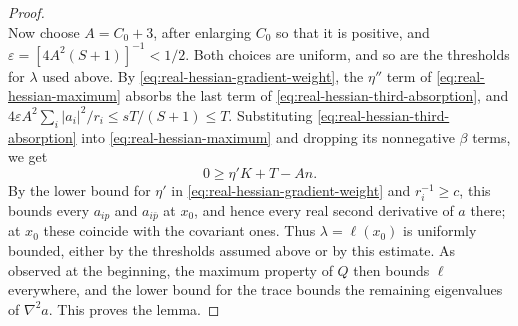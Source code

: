 \begin{proof}
\begin{equation}
\end{equation}
Now choose $A=C_0+3$, after enlarging $C_0$ so that it is positive, and $\varepsilon=[4A^2(S+1)]^{-1}<1/2$. Both choices are uniform, and so are the thresholds for $\lambda$ used above. By \eqref{eq:real-hessian-gradient-weight}, the $\eta''$ term of \eqref{eq:real-hessian-maximum} absorbs the last term of \eqref{eq:real-hessian-third-absorption}, and $4\varepsilon A^2\sum_i|a_i|^2/r_i\leq sT/(S+1)\leq T$. Substituting \eqref{eq:real-hessian-third-absorption} into \eqref{eq:real-hessian-maximum} and dropping its nonnegative $\beta$ terms, we get
\[
 0\geq\eta'K+T-An.
\]
By the lower bound for $\eta'$ in \eqref{eq:real-hessian-gradient-weight} and $r_i^{-1}\geq c$, this bounds every $a_{ip}$ and $a_{i\bar p}$ at $x_0$, and hence every real second derivative of $a$ there; at $x_0$ these coincide with the covariant ones. Thus $\lambda=\ell(x_0)$ is uniformly bounded, either by the thresholds assumed above or by this estimate. As observed at the beginning, the maximum property of $Q$ then bounds $\ell$ everywhere, and the lower bound for the trace bounds the remaining eigenvalues of $\nabla^2a$. This proves the lemma.
\end{proof}

